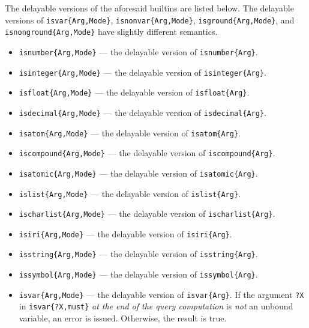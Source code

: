 \documentclass[11pt]{article}
\begin{document}
The delayable versions of the aforesaid builtins are listed below. The
delayable versions of
\texttt{isvar\{Arg,Mode\}}, \texttt{isnonvar\{Arg,Mode\}},
\texttt{isground\{Arg,Mode\}}, and
\texttt{isnonground\{Arg,Mode\}} have slightly different semantics.
\begin{itemize}
\item \texttt{isnumber\{Arg,Mode\}} --- the delayable version of
  \texttt{isnumber\{Arg\}}.
\item \texttt{isinteger\{Arg,Mode\}} --- the delayable version of
  \texttt{isinteger\{Arg\}}.
\item \texttt{isfloat\{Arg,Mode\}} --- the delayable version of
  \texttt{isfloat\{Arg\}}.
\item \texttt{isdecimal\{Arg,Mode\}} --- the delayable version of
  \texttt{isdecimal\{Arg\}}.
\item \texttt{isatom\{Arg,Mode\}} --- the delayable version of
  \texttt{isatom\{Arg\}}.
\item \texttt{iscompound\{Arg,Mode\}} --- the delayable version of
  \texttt{iscompound\{Arg\}}.
\item \texttt{isatomic\{Arg,Mode\}} --- the delayable version of
  \texttt{isatomic\{Arg\}}.
\item \texttt{islist\{Arg,Mode\}} --- the delayable version of
  \texttt{islist\{Arg\}}.
\item \texttt{ischarlist\{Arg,Mode\}} --- the delayable version of
  \texttt{ischarlist\{Arg\}}.
\item \texttt{isiri\{Arg,Mode\}} --- the delayable version of
  \texttt{isiri\{Arg\}}.
\item \texttt{isstring\{Arg,Mode\}} --- the delayable version of
  \texttt{isstring\{Arg\}}.
\item \texttt{issymbol\{Arg,Mode\}} --- the delayable version of
  \texttt{issymbol\{Arg\}}.
\item \texttt{isvar\{Arg,Mode\}} --- the delayable version of
  \texttt{isvar\{Arg\}}.
  If the argument \texttt{?X} in \texttt{isvar\{?X,must\}} \emph{at the end of
  the query computation} is \emph{not} an unbound
  variable, an error is issued. Otherwise, the result is true.

\end{itemize}
\end{document}
